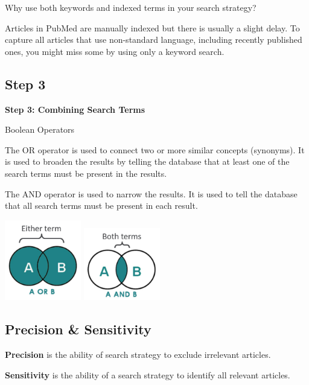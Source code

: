 \documentclass[
]{book}
\begin{document}
Why use both keywords and indexed terms in your search strategy?

Articles in PubMed are manually indexed but there is usually a slight delay. To capture all articles that use non-standard language, including recently published ones, you might miss some by using only a keyword search.

\hypertarget{step-3}{%
\subsection{Step 3}\label{step-3}}

\textbf{Step 3: Combining Search Terms}

Boolean Operators

The OR operator is used to connect two or more similar concepts (synonyms). It is used to broaden the results by telling the database that at least one of the search terms must be present in the results.

The AND operator is used to narrow the results. It is used to tell the database that all search terms must be present in each result.

\includegraphics[width=0.25\textwidth,height=0.25\textheight]{figs/booleanOR.png}
\includegraphics[width=0.25\textwidth,height=0.25\textheight]{figs/booleanAND.png}

\hypertarget{precision-sensitivity}{%
\subsection{Precision \& Sensitivity}\label{precision-sensitivity}}

\textbf{Precision} is the ability of search strategy to exclude irrelevant articles.

\textbf{Sensitivity} is the ability of a search strategy to identify all relevant articles.
\end{document}
